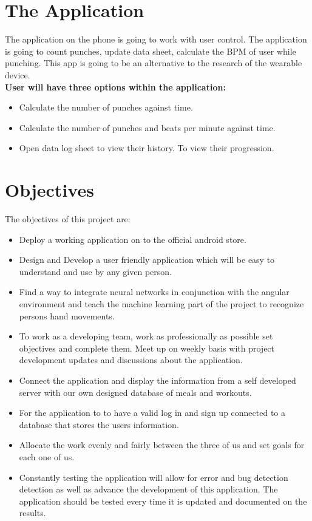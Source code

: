 \documentclass[a4paper,12pt,twoside]{report}
\begin{document}
\section{The Application}
The application on the phone is going to work with user control. The application is going to count punches, update data sheet, calculate the BPM of user while punching. This app is going to be an alternative to the research of the wearable device.
\\
\textbf{User will have three options within the application:}
\begin{itemize}
\item Calculate the number of punches against time.
\item Calculate the number of punches and beats per minute against time.
\item Open data log sheet to view their history. To view their progression.
\end{itemize}

\section{Objectives}
The objectives of this project are:
\begin{itemize}

\item Deploy a working application on to the official android store.
\item Design and Develop a user friendly application which will be easy to understand and use by any given person.
\item Find a way to integrate neural networks in conjunction with the angular environment and teach the machine learning part of the project to recognize persons hand movements.
\item To work as a developing team, work as professionally as possible set objectives and complete them. Meet up on weekly basis with project development updates and discussions about the application. 
\item Connect the application and display the information from a self developed server with our own designed database of meals and workouts.
\item For the application to to have a valid log in and sign up connected to a database that stores the users information.
\item Allocate the work evenly and fairly between the three of us and set goals for each one of us.
\item Constantly testing the application will allow for error and bug detection detection as well as advance the development of this application. The application should be tested every time it is updated and documented on the results.  
\end{itemize}
\end{document}
